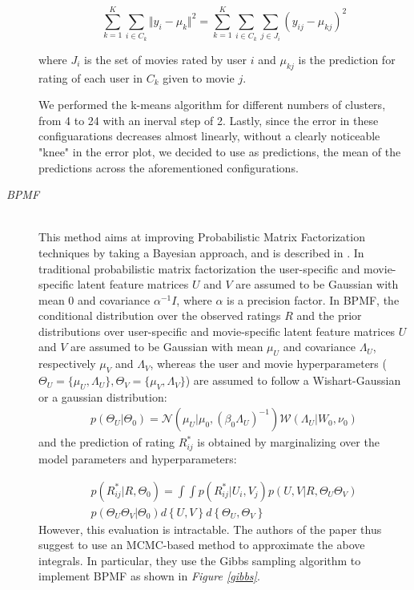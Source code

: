 \documentclass[10pt,conference,compsocconf]{IEEEtran}
\begin{document}
\begin{description}
$$
\sum_{k=1}^K \sum_{i \in C_k} \Vert y_i - \mu_k \Vert^2 = \sum_{k=1}^K \sum_{i \in C_k} \sum_{j \in J_i} (y_{ij} - \mu_{kj})^2
$$

\noindent where $J_i$ is the set of movies rated by user $i$ and $\mu_{kj}$ is the prediction for rating of each user in $C_k$ given to movie $j$.

We performed the k-means algorithm for different numbers of clusters, from 4 to 24 with an inerval step of 2. Lastly, since the error in these configuarations decreases almost linearly, without a clearly noticeable "knee" in the error plot, we decided to use as predictions, the mean of the predictions across the aforementioned configurations.

\vspace{2mm}
\item[\emph{BPMF}] \ \\
This method aims at improving Probabilistic Matrix Factorization techniques by taking a Bayesian approach, and is described in \cite{BPMF}. In traditional probabilistic matrix factorization the user-specific and movie-specific latent feature matrices $U$ and $V$ are assumed to be Gaussian with mean 0 and covariance $\alpha^{-1} I$, where $\alpha$ is a precision factor.  
In BPMF, the conditional distribution over the observed ratings $R$ and the prior distributions over user-specific and movie-specific latent feature matrices $U$ and $V$ are assumed to be Gaussian with mean $\mu_{U}$ and covariance $\Lambda_{U}$, respectively $\mu_{V}$ and $\Lambda_{V}$, whereas the user and movie hyperparameters ($\Theta_{U}=\{\mu_{U},\Lambda_{U}\}, \Theta_{V}=\{\mu_{V},\Lambda_{V}\}$) are assumed to follow a Wishart-Gaussian or a gaussian distribution:
$$
\begin{aligned}
p(\Theta_{U} \vert \Theta_{0}) =  \mathcal{N}(\mu_{U} \vert \mu_{0}, (\beta_{0}\Lambda_{U})^{-1})\mathcal{W}(\Lambda_{U} \vert W_{0}, \nu_{0})
\end{aligned}
$$
and the prediction of rating $R_{ij}^*$ is obtained by marginalizing over the model parameters and hyperparameters:

$$
\begin{aligned}
p(R_{ij}^* \vert R, \Theta_0) =  \int\int p(R_{ij}^* \vert U_i,V_j)p(U,V \vert R, \Theta_U \Theta_V) \\
p(\Theta_U \Theta_V \vert \Theta_0)d \left\lbrace U,V \right\rbrace  d \left\lbrace \Theta_U, \Theta_V \right\rbrace
\end{aligned}
$$
\noindent However, this evaluation is intractable. The authors of the paper thus suggest to use an MCMC-based method to approximate the above integrals. In particular, they use the Gibbs sampling algorithm to implement BPMF as shown in \emph{Figure \ref{gibbs}}.


\end{description}
\end{document}

